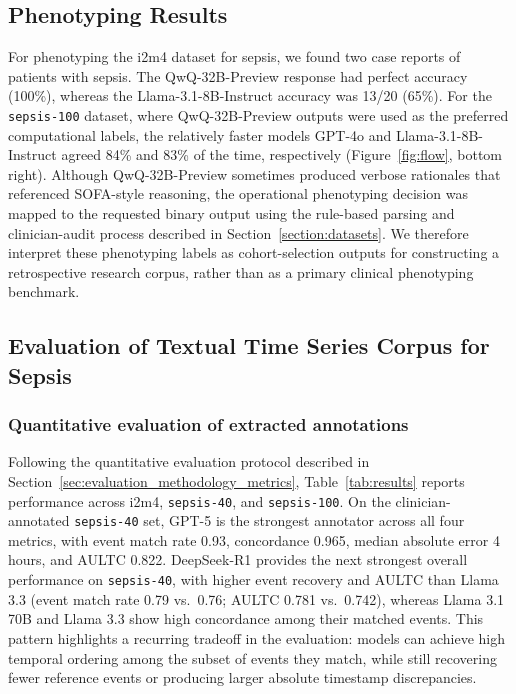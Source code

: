 \documentclass[pmlr,twocolumn,10pt]{jmlr} %
\begin{document}
\subsection{Phenotyping Results}
For phenotyping the i2m4 dataset for sepsis, we found two case reports of patients with sepsis.
The QwQ-32B-Preview response had perfect accuracy (100\%), whereas the Llama-3.1-8B-Instruct accuracy was 13/20 (65\%).
For the \texttt{sepsis-100} dataset, where QwQ-32B-Preview outputs were used as the preferred computational labels, the relatively faster models GPT-4o and Llama-3.1-8B-Instruct agreed 84\% and 83\% of the time, respectively (Figure~\ref{fig:flow}, bottom right).
Although QwQ-32B-Preview sometimes produced verbose rationales that referenced SOFA-style reasoning, the operational phenotyping decision was mapped to the requested binary output using the rule-based parsing and clinician-audit process described in Section~\ref{section:datasets}.
We therefore interpret these phenotyping labels as cohort-selection outputs for constructing a retrospective research corpus, rather than as a primary clinical phenotyping benchmark.

\subsection{Evaluation of Textual Time Series Corpus for Sepsis}
\subsubsection{Quantitative evaluation of extracted annotations}
\label{sec:annotation_results_quantitative}
Following the quantitative evaluation protocol described in Section~\ref{sec:evaluation_methodology_metrics}, Table~\ref{tab:results} reports performance across i2m4, \texttt{sepsis-40}, and \texttt{sepsis-100}.
On the clinician-annotated \texttt{sepsis-40} set, GPT-5 is the strongest annotator across all four metrics, with event match rate 0.93, concordance 0.965, median absolute error 4 hours, and AULTC 0.822.
DeepSeek-R1 provides the next strongest overall performance on \texttt{sepsis-40}, with higher event recovery and AULTC than Llama 3.3 (event match rate 0.79 vs.\ 0.76; AULTC 0.781 vs.\ 0.742), whereas Llama 3.1 70B and Llama 3.3 show high concordance among their matched events.
This pattern highlights a recurring tradeoff in the evaluation: models can achieve high temporal ordering among the subset of events they match, while still recovering fewer reference events or producing larger absolute timestamp discrepancies.
\end{document}
